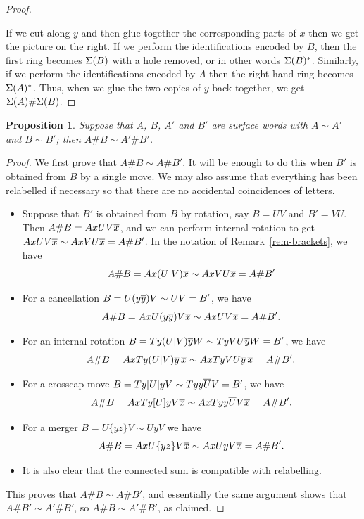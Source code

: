 \documentclass[reqno]{amsart}
\newtheorem{proposition}[theorem]{Proposition}
\theoremstyle{definition}
\begin{document}
\begin{proof}
\begin{center}
 \end{center}
 If we cut along $y$ and then glue together the corresponding parts of
 $x$ then we get the picture on the right.  If we perform the
 identifications encoded by $B$, then the first ring becomes $\Sigma(B)$
 with a hole removed, or in other words $\Sigma(B)^*$.  Similarly, if we
 perform the identifications encoded by $A$ then the right hand ring
 becomes $\Sigma(A)^*$.  Thus, when we glue the two copies of $y$ back
 together, we get $\Sigma(A)\#\Sigma(B)$.
\end{proof}

\begin{proposition}\label{prop-sum-invariant}
 Suppose that $A$, $B$, $A'$ and $B'$ are surface words with
 $A\sim A'$ and $B\sim B'$; then $A\#B\sim A'\#B'$.
\end{proposition}
\begin{proof}
 We first prove that $A\# B\sim A\# B'$.  It will be enough to do this
 when $B'$ is obtained from $B$ by a single move.  We may also assume
 that everything has been relabelled if necessary so that there are no
 accidental coincidences of letters.
 \begin{itemize}
  \item Suppose that $B'$ is obtained from $B$ by rotation, say $B=UV$
   and $B'=VU$.  Then $A\#B=AxUV\overline{x}$, and we can perform internal
   rotation to get $AxUV\overline{x}\sim AxVU\overline{x}=A\#B'$.  In the notation of
   Remark~\ref{rem-brackets}, we have 
   \[ A\#B=Ax(U|V)\overline{x}\sim AxVU\overline{x}=A\#B' \]
  \item For a cancellation $B=U(y\overline{y})V\sim UV=B'$, we have 
   \[ A\#B=AxU(y\overline{y})V\overline{x}\sim AxUV\overline{x}=A\#B'. \]
  \item For an internal rotation $B=Ty(U|V)\overline{y} W\sim TyVU\overline{y} W=B'$, we
   have 
   \[ A\#B=AxTy(U|V)\overline{y}\,\overline{x}\sim AxTyVU\overline{y}\,\overline{x}=A\#B'. \]
  \item For a crosscap move $B=Ty[U]yV\sim Tyy\overline{U}V=B'$, we
   have 
   \[ A\#B=AxTy[U]yV\overline{x}\sim AxTyy\overline{U}V\overline{x}=A\#B'. \]
  \item For a merger $B=U\{yz\}V\sim UyV$ we have
   \[ A\#B=AxU\{yz\}V\overline{x}\sim AxUyV\overline{x}=A\#B'. \]
  \item It is also clear that the connected sum is compatible with
   relabelling.
 \end{itemize}
 This proves that $A\#B\sim A\#B'$, and essentially the same argument
 shows that $A\# B'\sim A'\#B'$, so $A\# B\sim A'\# B'$, as claimed.
\end{proof}
\end{document}
